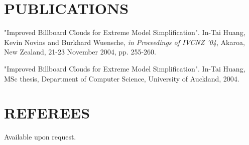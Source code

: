 \begin{resume}
\vspace{0.15in} 

\section{PUBLICATIONS} 
\vspace{0.1in}

"Improved Billboard Clouds for Extreme Model Simplification". In-Tai Huang, Kevin Novins and Burkhard Wuensche, \textit{in Proceedings of IVCNZ '04}, Akaroa, New Zealand, 21-23 November 2004, pp. 255-260. 

"Improved Billboard Clouds for Extreme Model Simplification". In-Tai Huang, MSc thesis, Department of Computer Science, University of Auckland, 2004.

\section{REFEREES} 
\vspace{0.1in}

Available upon request.
 
\end{resume}
































